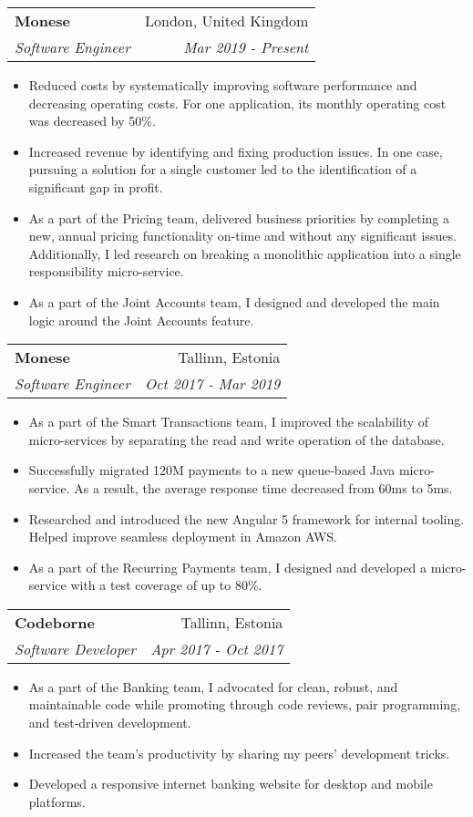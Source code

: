 \documentclass[11pt,a4paper,oneside]{report}
\makeatletter
\newcommand{\resumeItemWithoutTitle}[2]{
    \item\small{
        \textbf{#1}{#2\vspace{-2pt}}
    }
}
\newcommand{\resumeSubheading}[4]{
    \vspace{-1pt}\item
    \begin{tabular*}{0.97\textwidth}[t]{l@{\extracolsep{\fill}}r}
        \textbf{#1} & #2 \\
        \textit{\small#3} & \textit{\small #4} \\
    \end{tabular*}\vspace{-5pt}
}
\newcommand{\resumeSubSubheading}[2]{
    \begin{tabular*}{0.97\textwidth}{l@{\extracolsep{\fill}}r}
        \textit{\small#1} & \textit{\small #2} \\
    \end{tabular*}\vspace{-5pt}
}
\newcommand{\resumeItemListStart}{\begin{itemize}}
\newcommand{\resumeItemListEnd}{\end{itemize}\vspace{-5pt}}
\makeatother
\begin{document}
\resumeSubheading
{Monese}{London, United Kingdom}
{Software Engineer}{Mar 2019 - Present}
  \resumeItemListStart
    \resumeItemWithoutTitle{}
    {Reduced costs by systematically improving software performance and decreasing operating costs. For one application, its monthly operating cost was decreased by 50\%.}
    \resumeItemWithoutTitle{}
    {Increased revenue by identifying and fixing production issues. In one case, pursuing a solution for a single customer led to the identification of a significant gap in profit.}
    \resumeItemWithoutTitle{}
    {As a part of the Pricing team, delivered business priorities by completing a new, annual pricing functionality on-time and without any significant issues. 
    Additionally, I led research on breaking a monolithic application into a single responsibility micro-service.}
    \resumeItemWithoutTitle{}
    {As a part of the Joint Accounts team, I designed and developed the main logic around the Joint Accounts feature.}
  \resumeItemListEnd

\resumeSubheading
{Monese}{Tallinn, Estonia}
{Software Engineer}{Oct 2017 - Mar 2019}
  \resumeItemListStart
    \resumeItemWithoutTitle{}
    {As a part of the Smart Transactions team, I improved the scalability of micro-services by separating the read and write operation of the database.} 
    \resumeItemWithoutTitle{}
    {Successfully migrated 120M payments to a new queue-based Java micro-service. As a result, the average response time decreased from 60ms to 5ms.} 
    \resumeItemWithoutTitle{}
    {Researched and introduced the new Angular 5 framework for internal tooling. Helped improve seamless deployment in Amazon AWS.}
    \resumeItemWithoutTitle{}
    {As a part of the Recurring Payments team, I designed and developed a micro-service with a test coverage of up to 80\%.}
  \resumeItemListEnd

\resumeSubheading
{Codeborne}{Tallinn, Estonia}
{Software Developer}{Apr 2017 - Oct 2017}
  \resumeItemListStart
    \resumeItemWithoutTitle{}
    {As a part of the Banking team, I advocated for clean, robust, and maintainable code while promoting through code reviews, pair programming, and test-driven development.}
    \resumeItemWithoutTitle{}
    {Increased the team's productivity by sharing my peers' development tricks.}
    \resumeItemWithoutTitle{}
    {Developed a responsive internet banking website for desktop and mobile platforms.}
  \resumeItemListEnd
\end{document}
